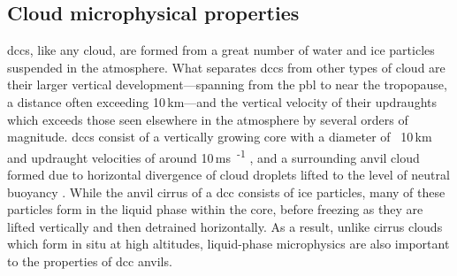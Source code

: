 
\subsection{Cloud microphysical properties}

\acrshort{dcc}s, like any cloud, are formed from a great number of water and ice particles suspended in the atmosphere.
What separates \acrshort{dcc}s from other types of cloud are their larger vertical development---spanning from the \acrfull{pbl} to near the tropopause, a distance often exceeding 10\,\unit{km}---and the vertical velocity of their updraughts which exceeds those seen elsewhere in the atmosphere by several orders of magnitude.
\acrshort{dcc}s consist of a vertically growing core with a diameter of ~10\,\unit{km} and updraught velocities of around 10\,\unit{ms\textsuperscript{-1}} \citep{weisman_mesoscale_2015}, and a surrounding anvil cloud formed due to horizontal divergence of cloud droplets lifted to the level of neutral buoyancy \citep{houze_chapter_2014}.
While the anvil cirrus of a \acrshort{dcc} consists of ice particles, many of these particles form in the liquid phase within the core, before freezing as they are lifted vertically and then detrained horizontally.
As a result, unlike cirrus clouds which form in situ at high altitudes, liquid-phase microphysics are also important to the properties of \acrshort{dcc} anvils.

